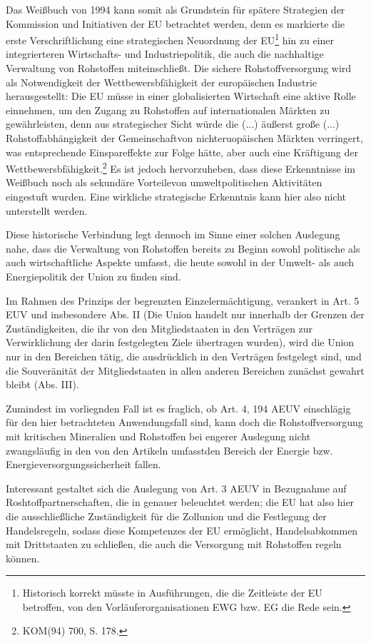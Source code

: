 \documentclass[12pt,a4paper,oneside]{book} %
\begin{document}
	Das Weißbuch von 1994 kann somit als Grundstein für spätere Strategien der Kommission und Initiativen der EU betrachtet werden, denn es markierte die erste Verschriftlichung eine strategischen Neuordnung der EU\footnote{Historisch korrekt müsste in Ausführungen, die die Zeitleiste der EU betroffen, von den Vorläuferorganisationen EWG bzw. EG die Rede sein.} hin zu einer integrierteren Wirtschafts- und Industriepolitik, die auch die nachhaltige Verwaltung von Rohstoffen miteinschließt. Die sichere Rohstoffversorgung wird als Notwendigkeit der Wettbewersbfähigkeit der europäischen Industrie herausgestellt: Die EU müsse in einer globalisierten Wirtschaft eine aktive Rolle einnehmen, um den Zugang zu  Rohstoffen auf internationalen Märkten zu gewährleisten, denn aus strategischer Sicht würde die \glqq (...) äußerst große (...) Rohstoffabhängigkeit der Gemeinschaft\grqq von nichteruopäischen Märkten verringert, was entsprechende Einspareffekte zur Folge hätte, aber auch eine Kräftigung der Wettbewersbfähigkeit.\footnote{KOM(94) 700, S. 178.} Es ist jedoch hervorzuheben, dass diese Erkenntnisse im Weißbuch noch als \glqq sekundäre Vorteile\grqq von umweltpolitischen Aktivitäten eingestuft wurden. Eine wirkliche strategische Erkenntnis kann hier also nicht unterstellt werden.
	
	Diese historische Verbindung legt dennoch im Sinne einer solchen Auslegung nahe, dass die Verwaltung von Rohstoffen bereits zu Beginn sowohl politische als auch wirtschaftliche Aspekte umfasst, die heute sowohl in der Umwelt- als auch Energiepolitik der Union zu finden sind.
	
	Im Rahmen des Prinzips der begrenzten Einzelermächtigung, verankert in Art. 5 EUV  und insbesondere Abs. II (Die Union handelt nur innerhalb der Grenzen der Zuständigkeiten, die ihr von den Mitgliedstaaten in den Verträgen zur Verwirklichung der darin festgelegten Ziele übertragen wurden), wird die Union nur in den Bereichen tätig, die ausdrücklich in den Verträgen festgelegt sind, und  die Souveränität der Mitgliedstaaten in allen anderen Bereichen zunächst gewahrt bleibt (Abs. III).
	
	Zumindest im vorliegnden Fall ist es fraglich, ob Art. 4, 194 AEUV einschlägig für den hier betrachteten Anwendungsfall sind, kann doch die Rohstoffversorgung mit kritischen Mineralien und Rohstoffen bei engerer Auslegung nicht zwangsläufig in den von den Artikeln umfasstden Bereich der Energie bzw. Energieversorgungssicherheit fallen.
	
	Interessant gestaltet sich die Auslegung von Art. 3 AEUV in Bezugnahme auf Roshtoffpartnerschaften, die in %
	genauer beleuchtet werden; die EU hat also hier die ausschließliche Zuständigkeit für die Zollunion und die Festlegung der Handelsregeln, sodass diese Kompetenzes der EU ermöglicht, Handelsabkommen mit Drittstaaten zu schließen, die auch die Versorgung mit Rohstoffen regeln können.
	
\end{document}
